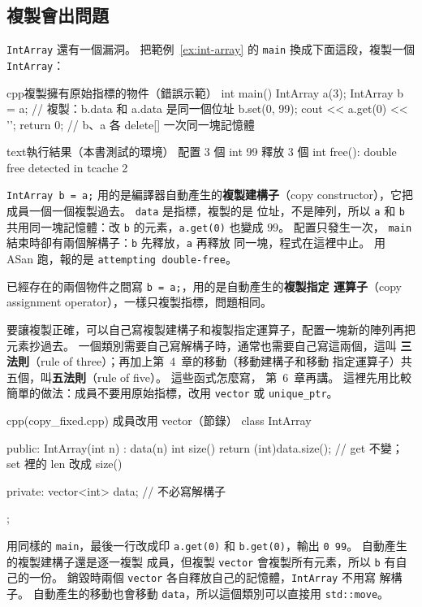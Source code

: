 \subsection{複製會出問題}

\texttt{IntArray} 還有一個漏洞。 把範例~\ref{ex:int-array} 的
\texttt{main} 換成下面這段，複製一個 \texttt{IntArray}：

\begin{code}{cpp}{複製擁有原始指標的物件（錯誤示範）}
int main() {
    IntArray a(3);
    IntArray b = a;          // 複製：b.data 和 a.data 是同一個位址
    b.set(0, 99);
    cout << a.get(0) << '\n';
    return 0;
}                            // b、a 各 delete[] 一次同一塊記憶體
\end{code}

\begin{code}{text}{執行結果（本書測試的環境）}
配置 3 個 int
99
釋放 3 個 int
free(): double free detected in tcache 2
\end{code}

\texttt{IntArray b = a;} 用的是編譯器自動產生的\textbf{複製建構子}（copy
constructor），它把成員一個一個複製過去。 \texttt{data} 是指標，複製的是
位址，不是陣列，所以 \texttt{a} 和 \texttt{b} 共用同一塊記憶體：改
\texttt{b} 的元素，\texttt{a.get(0)} 也變成 $99$。 配置只發生一次，
\texttt{main} 結束時卻有兩個解構子：\texttt{b} 先釋放，\texttt{a} 再釋放
同一塊，程式在這裡中止。 用 ASan 跑，報的是 \texttt{attempting
double-free}。

已經存在的兩個物件之間寫 \texttt{b = a;}，用的是自動產生的\textbf{複製指定
運算子}（copy assignment operator），一樣只複製指標，問題相同。

要讓複製正確，可以自己寫複製建構子和複製指定運算子，配置一塊新的陣列再把
元素抄過去。 一個類別需要自己寫解構子時，通常也需要自己寫這兩個，這叫
\textbf{三法則}（rule of three）；再加上第~4~章的移動（移動建構子和移動
指定運算子）共五個，叫\textbf{五法則}（rule of five）。 這些函式怎麼寫，
第~6~章再講。 這裡先用比較簡單的做法：成員不要用原始指標，改用
\texttt{vector} 或 \texttt{unique\_ptr}。

\begin{code}{cpp}{(copy\_fixed.cpp) 成員改用 vector（節錄）}
class IntArray {
public:
    IntArray(int n) : data(n) {}
    int size() {
        return (int)data.size();
    }
    // get 不變；set 裡的 len 改成 size()

private:
    vector<int> data;        // 不必寫解構子
};
\end{code}

用同樣的 \texttt{main}，最後一行改成印 \texttt{a.get(0)} 和
\texttt{b.get(0)}，輸出 \texttt{0 99}。 自動產生的複製建構子還是逐一複製
成員，但複製 \texttt{vector} 會複製所有元素，所以 \texttt{b} 有自己的一份。
銷毀時兩個 \texttt{vector} 各自釋放自己的記憶體，\texttt{IntArray} 不用寫
解構子。 自動產生的移動也會移動 \texttt{data}，所以這個類別可以直接用
\texttt{std::move}。

